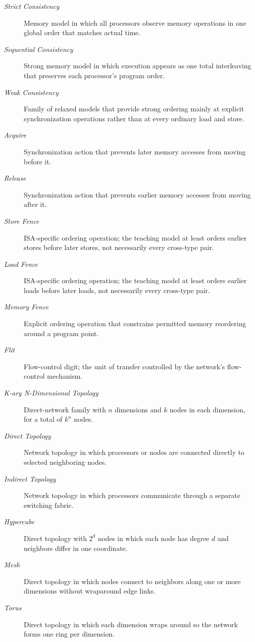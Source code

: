 \begin{description}
    \item[\textit{Strict Consistency}] Memory model in which all processors observe memory operations in one global order that matches actual time.
    \item[\textit{Sequential Consistency}] Strong memory model in which execution appears as one total interleaving that preserves each processor's program order.
    \item[\textit{Weak Consistency}] Family of relaxed models that provide strong ordering mainly at explicit synchronization operations rather than at every ordinary load and store.
    \item[\textit{Acquire}] Synchronization action that prevents later memory accesses from moving before it.
    \item[\textit{Release}] Synchronization action that prevents earlier memory accesses from moving after it.
    \item[\textit{Store Fence}] ISA-specific ordering operation; the teaching model at least orders earlier stores before later stores, not necessarily every cross-type pair.
    \item[\textit{Load Fence}] ISA-specific ordering operation; the teaching model at least orders earlier loads before later loads, not necessarily every cross-type pair.
    \item[\textit{Memory Fence}] Explicit ordering operation that constrains permitted memory reordering around a program point.
    \item[\textit{Flit}] Flow-control digit; the unit of transfer controlled by the network's flow-control mechanism.
    \item[\textit{K-ary N-Dimensional Topology}] Direct-network family with $n$ dimensions and $k$ nodes in each dimension, for a total of $k^n$ nodes.
    \item[\textit{Direct Topology}] Network topology in which processors or nodes are connected directly to selected neighboring nodes.
    \item[\textit{Indirect Topology}] Network topology in which processors communicate through a separate switching fabric.
    \item[\textit{Hypercube}] Direct topology with $2^d$ nodes in which each node has degree $d$ and neighbors differ in one coordinate.
    \item[\textit{Mesh}] Direct topology in which nodes connect to neighbors along one or more dimensions without wraparound edge links.
    \item[\textit{Torus}] Direct topology in which each dimension wraps around so the network forms one ring per dimension.

\end{description}
